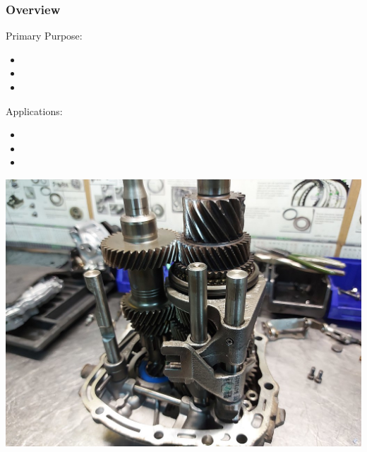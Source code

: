 \documentclass[fleqn]{beamer} %
\newcommand{\sectiontitleI}{Overview} %
\begin{document}
		\begin{frame}[label=sectionI] \small
			\frametitle{\sectiontitleI}	
	
			\begin{multicols}{2}	

				Primary Purpose:
				\begin{itemize}
					\item 
					\item
					\item
				\end{itemize}

				Applications:
				\begin{itemize}
						\item 
						\item
						\item
				\end{itemize}


				\includegraphics[scale=0.15]{images/manual_transmission.png}
		
			\end{multicols}

		\end{frame}


	
\end{document}
